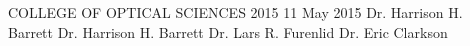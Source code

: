 
\maketitlepage
{COLLEGE OF OPTICAL SCIENCES}	%
{2015}							
%
\approval
{11 May 2015}		%
{Dr. Harrison H. Barrett}	%
{Dr. Harrison H. Barrett}%
{Dr. Lars R. Furenlid}		%
{Dr. Eric Clarkson}		%

\statementbyauthor


